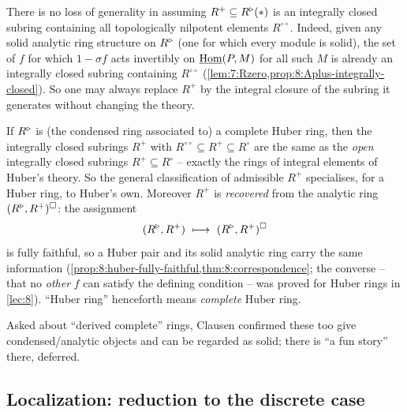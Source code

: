 \begin{remark}
\label{rmk:9:integrally-closed}
There is no loss of generality in assuming $R^{+}\subseteq R^{\triangleright}(\ast)$ is an
integrally closed subring containing all topologically nilpotent elements
$R^{\circ\circ}$. Indeed, given any solid analytic ring structure on $R^{\triangleright}$
(one for which every module is solid), the set of $f$ for which
$1-\sigma f$ acts invertibly on $\underline{\operatorname{Hom}}(P,M)$ for all such $M$ is already an
integrally closed subring containing $R^{\circ\circ}$
(\cref{lem:7:Rzero,prop:8:Aplus-integrally-closed}). So one may always replace
$R^{+}$ by the integral closure of the subring it generates without changing the
theory.
\end{remark}

\begin{example}
\label{ex:9:huber-pair}
If $R^{\triangleright}$ is (the condensed ring associated to) a complete Huber ring, then the
integrally closed subrings $R^{+}$ with $R^{\circ\circ}\subseteq R^{+}\subseteq
R^{\circ}$ are the same as the \emph{open} integrally closed subrings
$R^{+}\subseteq R^{\circ}$ -- exactly the rings of integral elements of Huber's
theory. So the general classification of admissible $R^{+}$ specialises,
for a Huber ring, to Huber's own. Moreover $R^{+}$ is \emph{recovered} from the
analytic ring $(R^{\triangleright},R^{+})^{\square}$: the assignment
\begin{equation*}
(R^{\triangleright},R^{+})\ \longmapsto\ (R^{\triangleright},R^{+})^{\square}
\end{equation*}
is fully faithful, so a Huber pair and its solid analytic ring carry the same
information (\cref{prop:8:huber-fully-faithful,thm:8:correspondence};
the converse -- that no \emph{other} $f$ can satisfy the defining condition --
was proved for Huber rings in \cref{lec:8}). ``Huber ring'' henceforth means
\emph{complete} Huber ring.
\end{example}

\begin{remark}
\label{rmk:9:derived-complete}
Asked about ``derived complete'' rings, Clausen confirmed these too give
condensed/analytic objects and can be regarded as solid; there is ``a fun
story'' there, deferred.
\end{remark}

\subsection{Localization: reduction to the discrete case}

